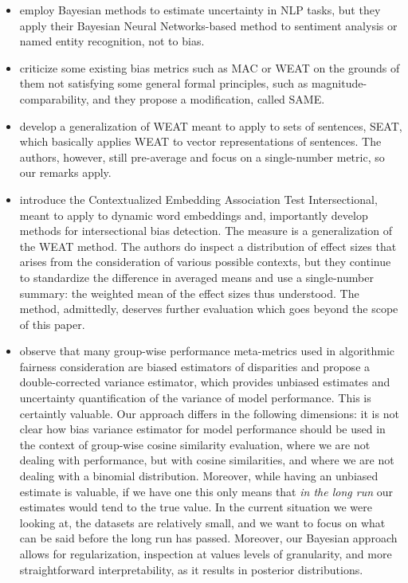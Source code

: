 \documentclass{clv3}
\begin{document}
\begin{itemize}
\item  \citet{DBLP:journals/corr/abs-1811-07253} employ Bayesian methods to estimate uncertainty in NLP tasks,
  but they apply their Bayesian Neural Networks-based method to
  sentiment analysis or named entity recognition, not to bias.


\item    \citet{schroder2021evaluating} criticize some existing bias metrics such as \textsf{MAC} or
  \textsf{WEAT} on the grounds of them not satisfying some general
  formal principles, such as magnitude-comparability, and they propose a
  modification, called \textsf{SAME}.

\item \citet{may-etal-2019-measuring} develop a generalization of \textsf{WEAT} meant to apply to
  sets of sentences, \textsf{SEAT}, which basically applies
  \textsf{WEAT} to vector representations of sentences. The authors,
  however, still pre-average and focus on a
  single-number metric, so our remarks apply.

\item \citet{Guo2021CEAT} introduce the Contextualized Embedding Association Test
  Intersectional, meant to apply to dynamic word embeddings and,
  importantly develop methods for intersectional bias detection. The
  measure is a generalization of the WEAT method. The authors do inspect
  a distribution of effect sizes that arises from the consideration of
  various possible contexts, but they continue to standardize the
  difference in averaged means and use a single-number summary: the
  weighted mean of the effect sizes thus understood. The method,
  admittedly, deserves further evaluation which goes beyond the scope of
  this paper.
  
\item \citet{Lum2022Debiasing} observe that many group-wise performance meta-metrics used in algorithmic fairness consideration are biased estimators of disparities and propose a double-corrected variance estimator, which provides unbiased estimates and uncertainty quantification of the variance of model performance. This is certaintly valuable. Our approach differs in the following dimensions: it is not clear how bias variance estimator for model performance should be used in the context of group-wise cosine similarity evaluation, where we are not dealing with performance, but with cosine similarities, and where we are not dealing with a binomial distribution. Moreover, while having an unbiased estimate is valuable, if we have one this only means that \emph{in the long run} our estimates would tend to the true value. In the current situation we were looking at, the datasets are relatively small, and we want to focus on what can be said before the long run has passed. Moreover, our Bayesian approach allows for regularization, inspection at values levels of granularity, and more straightforward interpretability, as it results in posterior distributions.


\end{itemize}
\end{document}
